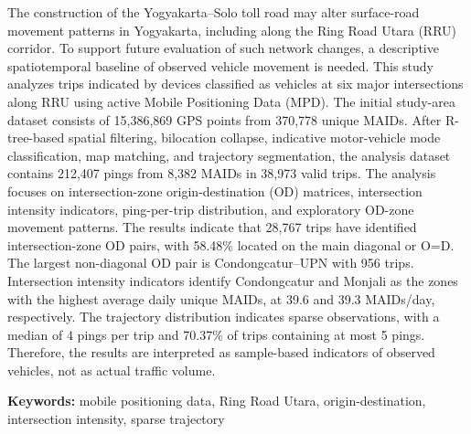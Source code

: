 The construction of the Yogyakarta--Solo toll road may alter surface-road movement patterns in Yogyakarta, including along the Ring Road Utara (RRU) corridor. To support future evaluation of such network changes, a descriptive spatiotemporal baseline of observed vehicle movement is needed. This study analyzes trips indicated by devices classified as vehicles at six major intersections along RRU using active Mobile Positioning Data (MPD). The initial study-area dataset consists of 15,386,869 GPS points from 370,778 unique MAIDs. After R-tree-based spatial filtering, bilocation collapse, indicative motor-vehicle mode classification, map matching, and trajectory segmentation, the analysis dataset contains 212,407 pings from 8,382 MAIDs in 38,973 valid trips. The analysis focuses on intersection-zone origin-destination (OD) matrices, intersection intensity indicators, ping-per-trip distribution, and exploratory OD-zone movement patterns. The results indicate that 28,767 trips have identified intersection-zone OD pairs, with 58.48\% located on the main diagonal or O=D. The largest non-diagonal OD pair is Condongcatur--UPN with 956 trips. Intersection intensity indicators identify Condongcatur and Monjali as the zones with the highest average daily unique MAIDs, at 39.6 and 39.3 MAIDs/day, respectively. The trajectory distribution indicates sparse observations, with a median of 4 pings per trip and 70.37\% of trips containing at most 5 pings. Therefore, the results are interpreted as sample-based indicators of observed vehicles, not as actual traffic volume.

\textbf{Keywords:} mobile positioning data, Ring Road Utara, origin-destination, intersection intensity, sparse trajectory
